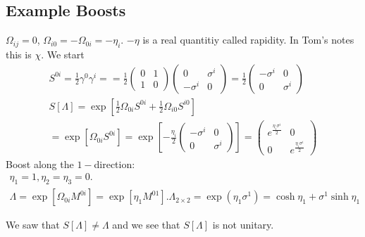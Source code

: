 \documentclass[]{scrartcl}
\begin{document}
\subsection{Example Boosts}
$\Omega_{ij} = 0$, $\Omega_{i0} = -\Omega_{0i} = -\eta_i$. $-\eta$ is a real quantitiy called rapidity. In Tom's notes this is $\chi$.
We start
\begin{gather}
	S^{0i} = \frac{1}{2}\gamma^0\gamma^i = = \frac{1}{2}
	\begin{pmatrix}
		0 & 1 \\ 1 & 0
	\end{pmatrix}
	\begin{pmatrix}
		0 & \sigma^i \\ -\sigma^i & 0
	\end{pmatrix}=
	\frac{1}{2}
	\begin{pmatrix}
		-\sigma^i & 0 \\ 0 & \sigma^i
	\end{pmatrix}\\
	S[\Lambda] = \exp\left[\frac{1}{2}\Omega_{0i}S^{0i} + \frac{1}{2}\Omega_{i0}S^{i0}\right]\\
	= \exp\left[\Omega_{0i}S^{0i}\right] = \exp\left[-\frac{\eta_i}{2}
	\begin{pmatrix}
		-\sigma^i & 0 \\ 0 & \sigma^i
	\end{pmatrix}
	\right]
	=
	\begin{pmatrix}
		e^{\frac{\eta_i\sigma^i}{2}} & 0\\
		0 & e^{\frac{\eta_i\sigma^i}{2}}
	\end{pmatrix}
\end{gather}
Boost along the $1-$direction:
\begin{gather}
	\eta_1 = 1, \eta_2 = \eta_3 = 0.\\
	\Lambda = \exp[\Omega_{0i}M^{0i}] = \exp[\eta_1M^{01}]. 
	\Lambda_{2\times2} = \exp\left(\eta_1\sigma^1\right) = \cosh\eta_1 + \sigma^1\sinh\eta_1
\end{gather}

We saw that $S[\Lambda] \neq \Lambda$ and we see that $S[\Lambda]$ is not unitary.
\end{document}
